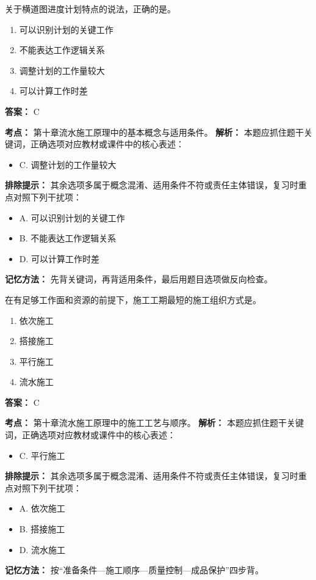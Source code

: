 \documentclass[UTF8,fontset=fandol,11pt]{ctexart}
\begin{document}
\begin{quizbox}[title={第 1 题}]
关于横道图进度计划特点的说法，正确的是。\\
\begin{enumerate}[label=\Alph*.]
\item 可以识别计划的关键工作
\item 不能表达工作逻辑关系
\item 调整计划的工作量较大
\item 可以计算工作时差
\end{enumerate}
\textbf{答案：} C
\vspace{0.25em}
\begin{answerbox}[title={考点解析}]
\textbf{考点：} 第十章流水施工原理中的基本概念与适用条件。
\textbf{解析：} 本题应抓住题干关键词，正确选项对应教材或课件中的核心表述：
\begin{itemize}
\item C. 调整计划的工作量较大
\end{itemize}
\textbf{排除提示：} 其余选项多属于概念混淆、适用条件不符或责任主体错误，复习时重点对照下列干扰项：
\begin{itemize}
\item A. 可以识别计划的关键工作
\item B. 不能表达工作逻辑关系
\item D. 可以计算工作时差
\end{itemize}
\textbf{记忆方法：} 先背关键词，再背适用条件，最后用题目选项做反向检查。
\end{answerbox}
\end{quizbox}

\vspace{0.2em}

\begin{quizbox}[title={第 2 题}]
在有足够工作面和资源的前提下，施工工期最短的施工组织方式是。\\
\begin{enumerate}[label=\Alph*.]
\item 依次施工
\item 搭接施工
\item 平行施工
\item 流水施工
\end{enumerate}
\textbf{答案：} C
\vspace{0.25em}
\begin{answerbox}[title={考点解析}]
\textbf{考点：} 第十章流水施工原理中的施工工艺与顺序。
\textbf{解析：} 本题应抓住题干关键词，正确选项对应教材或课件中的核心表述：
\begin{itemize}
\item C. 平行施工
\end{itemize}
\textbf{排除提示：} 其余选项多属于概念混淆、适用条件不符或责任主体错误，复习时重点对照下列干扰项：
\begin{itemize}
\item A. 依次施工
\item B. 搭接施工
\item D. 流水施工
\end{itemize}
\textbf{记忆方法：} 按“准备条件—施工顺序—质量控制—成品保护”四步背。
\end{answerbox}
\end{quizbox}
\end{document}
